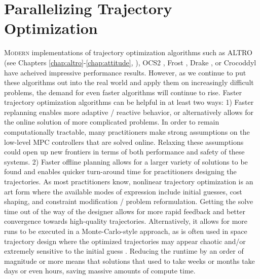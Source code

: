 \documentclass[../root.tex]{subfiles}
\begin{document}
\chapter{Parallelizing Trajectory Optimization} \label{chap:parallel}

\lettrine{M}{odern} implementations of trajectory optimization algorithms
such as ALTRO (see Chapters \ref{chap:altro}-\ref{chap:attitude},
\cite{howell_ALTRO_2019}), OCS2 \cite{farshidian_OCS2_}, Frost
\cite{hereid_FROST_2017}, Drake \cite{tedrake_Drake_}, or Crocoddyl
\cite{mastalli_Crocoddyl_2019} have acheived impressive performance results.
However, as we continue to put these algorithms out into the real world and
apply them on increasingly difficult problems, the demand for even faster
algorithms will continue to rise. Faster trajectory optimization algorithms
can be helpful in at least two ways: 1) Faster replanning enables more
adaptive / reactive behavior, or alternatively allows for the online solution
of more complicated problems. In order to remain computationally tractable,
many practitioners make strong assumptions on the low-level MPC controllers
that are solved online. Relaxing these assumptions could open up new
frontiers in terms of both performance and safety of these systems. 2) Faster
offline planning allows for a larger variety of solutions to be found and
enables quicker turn-around time for practitioners designing the
trajectories. As most practitioners know, nonlinear trajectory optimization
is an art form where the available modes of expression include initial
guesses, cost shaping, and constraint modification / problem reformulation.
Getting the solve time out of the way of the designer allows for more rapid
feedback and better convergence towards high-quality trajectories.
Alternatively, it allows for more runs to be executed in a Monte-Carlo-style
approach, as is often used in space trajectory design where the optimized
trajectories may appear chaotic and/or extremely sensitive to the initial
guess
\cite{grebow_MCOLL_2017,englander_Multiobjective_2015,tracy_LowThrust_2021}.
Reducing the runtime by an order of magnitude or more means that solutions
that used to take weeks or months take days or even hours, saving massive
amounts of compute time.
\end{document}
